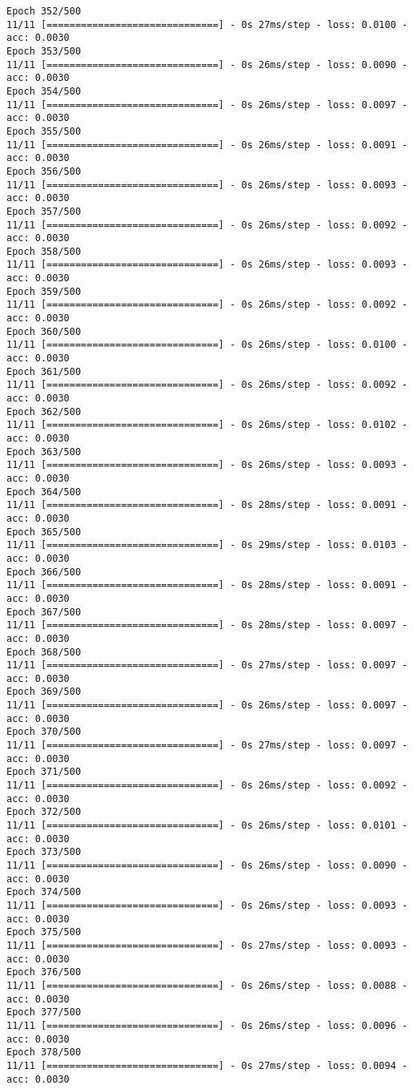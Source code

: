 \documentclass[11pt]{article}
\begin{document}
\begin{Verbatim}[commandchars=\\\{\}]
Epoch 352/500
11/11 [==============================] - 0s 27ms/step - loss: 0.0100 - acc: 0.0030
Epoch 353/500
11/11 [==============================] - 0s 26ms/step - loss: 0.0090 - acc: 0.0030
Epoch 354/500
11/11 [==============================] - 0s 26ms/step - loss: 0.0097 - acc: 0.0030
Epoch 355/500
11/11 [==============================] - 0s 26ms/step - loss: 0.0091 - acc: 0.0030
Epoch 356/500
11/11 [==============================] - 0s 26ms/step - loss: 0.0093 - acc: 0.0030
Epoch 357/500
11/11 [==============================] - 0s 26ms/step - loss: 0.0092 - acc: 0.0030
Epoch 358/500
11/11 [==============================] - 0s 26ms/step - loss: 0.0093 - acc: 0.0030
Epoch 359/500
11/11 [==============================] - 0s 26ms/step - loss: 0.0092 - acc: 0.0030
Epoch 360/500
11/11 [==============================] - 0s 26ms/step - loss: 0.0100 - acc: 0.0030
Epoch 361/500
11/11 [==============================] - 0s 26ms/step - loss: 0.0092 - acc: 0.0030
Epoch 362/500
11/11 [==============================] - 0s 26ms/step - loss: 0.0102 - acc: 0.0030
Epoch 363/500
11/11 [==============================] - 0s 26ms/step - loss: 0.0093 - acc: 0.0030
Epoch 364/500
11/11 [==============================] - 0s 28ms/step - loss: 0.0091 - acc: 0.0030
Epoch 365/500
11/11 [==============================] - 0s 29ms/step - loss: 0.0103 - acc: 0.0030
Epoch 366/500
11/11 [==============================] - 0s 28ms/step - loss: 0.0091 - acc: 0.0030
Epoch 367/500
11/11 [==============================] - 0s 28ms/step - loss: 0.0097 - acc: 0.0030
Epoch 368/500
11/11 [==============================] - 0s 27ms/step - loss: 0.0097 - acc: 0.0030
Epoch 369/500
11/11 [==============================] - 0s 26ms/step - loss: 0.0097 - acc: 0.0030
Epoch 370/500
11/11 [==============================] - 0s 27ms/step - loss: 0.0097 - acc: 0.0030
Epoch 371/500
11/11 [==============================] - 0s 26ms/step - loss: 0.0092 - acc: 0.0030
Epoch 372/500
11/11 [==============================] - 0s 26ms/step - loss: 0.0101 - acc: 0.0030
Epoch 373/500
11/11 [==============================] - 0s 26ms/step - loss: 0.0090 - acc: 0.0030
Epoch 374/500
11/11 [==============================] - 0s 26ms/step - loss: 0.0093 - acc: 0.0030
Epoch 375/500
11/11 [==============================] - 0s 27ms/step - loss: 0.0093 - acc: 0.0030
Epoch 376/500
11/11 [==============================] - 0s 26ms/step - loss: 0.0088 - acc: 0.0030
Epoch 377/500
11/11 [==============================] - 0s 26ms/step - loss: 0.0096 - acc: 0.0030
Epoch 378/500
11/11 [==============================] - 0s 27ms/step - loss: 0.0094 - acc: 0.0030

\end{Verbatim}
\end{document}
